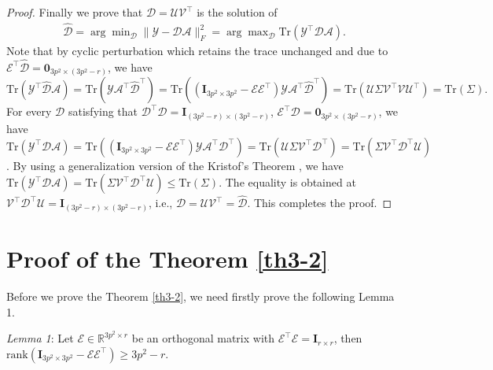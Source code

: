 \begin{proof}
Finally we prove that $\hat{\mathcal{D}}=\mathcal{U}\mathcal{V}^{\top}$ is the solution of
\begin{equation}
\label{equ8-13}
\begin{split}
\hat{\mathcal{D}}
=
\arg\min\nolimits_{\mathcal{D}}
\|\mathcal{Y}-\mathcal{D}\mathcal{A}\|_{F}^{2}
=
\arg\max\nolimits_{\mathcal{D}}
\text{Tr}(\mathcal{Y}^{\top}\mathcal{D}\mathcal{A}).
\end{split}
\end{equation}
Note that by cyclic perturbation which retains the trace unchanged and due to $\mathcal{E}^{\top}\hat{\mathcal{D}}=\bm{0}_{3p^2\times (3p^2-r)}$, we have 
$
\text{Tr}(\mathcal{Y}^{\top}\hat{\mathcal{D}}\mathcal{A})
=
\text{Tr}(\mathcal{Y}\mathcal{A}^{\top}\hat{\mathcal{D}}^{\top})
=
\text{Tr}((\bm{I}_{3p^2\times 3p^2}-\mathcal{E}\mathcal{E}^{\top})\mathcal{Y}\mathcal{A}^{\top}\hat{\mathcal{D}}^{\top})
=
\text{Tr}(\mathcal{U}\Sigma\mathcal{V}^{\top}\mathcal{V}\mathcal{U}^{\top})
=
\text{Tr}(\Sigma).
$
For every $\mathcal{D}$ satisfying that $\mathcal{D}^{\top}\mathcal{D} = \bm{I}_{(3p^2-r)\times (3p^2-r)}$, $\mathcal{E}^{\top}\mathcal{D} = \bm{0}_{3p^2\times (3p^2-r)}$, we have 
$
\text{Tr}(\mathcal{Y}^{\top}\mathcal{D}\mathcal{A})
=
\text{Tr}((\bm{I}_{3p^2\times 3p^2}-\mathcal{E}\mathcal{E}^{\top})\mathcal{Y}\mathcal{A}^{\top}\mathcal{D}^{\top})
=
\text{Tr}(\mathcal{U}\Sigma\mathcal{V}^{\top}\mathcal{D}^{\top})
=
\text{Tr}(\Sigma\mathcal{V}^{\top}\mathcal{D}^{\top}\mathcal{U})
$.
By using a generalization version \cite{TenBerge1983} of the Kristof's Theorem \cite{Kristof1970515}, we have $\text{Tr}(\mathcal{Y}^{\top}\mathcal{D}\mathcal{A})
=
\text{Tr}(\Sigma\mathcal{V}^{\top}\mathcal{D}^{\top}\mathcal{U})
\le
\text{Tr}(\Sigma)
.
$
The equality is obtained at 
$\mathcal{V}^{\top}\mathcal{D}^{\top}\mathcal{U}=\bm{I}_{(3p^2-r)\times (3p^2-r)}$, i.e., $\mathcal{D}=\mathcal{U}\mathcal{V}^{\top}=\hat{\mathcal{D}}$. This completes the proof.
\end{proof}

\section{Proof of the Theorem \ref{th3-2}}

Before we prove the Theorem \ref{th3-2}, we need firstly prove the following Lemma 1.

\emph{Lemma 1}: Let $\mathcal{E}\in\mathbb{R}^{3p^2\times r}$ be an orthogonal matrix with $\mathcal{E}^{\top}\mathcal{E}=\bm{I}_{r\times r}$, then $\text{rank}(\bm{I}_{3p^2\times 3p^2}-\mathcal{E}\mathcal{E}^{\top})\ge 3p^2-r$.

